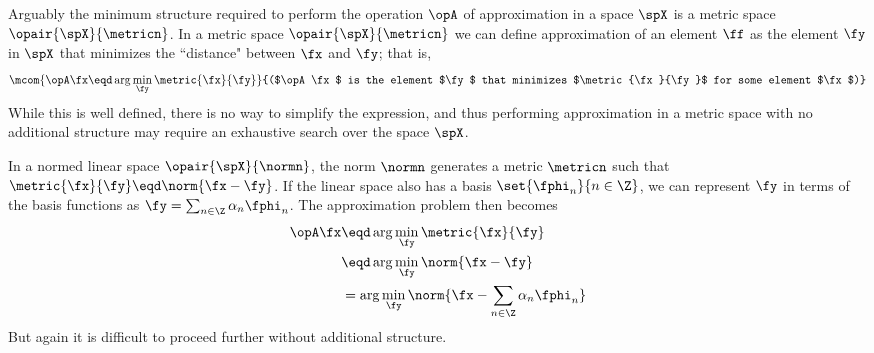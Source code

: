 Arguably the minimum structure required to perform the operation $\opA$ of approximation
in a space $\spX$
is a metric space $\opair{\spX}{\metricn}$.
In a metric space $\opair{\spX}{\metricn}$ we can define approximation of an element $\ff$ as
the element $\fy$ in $\spX$ that minimizes the ``distance" between $\fx$ and $\fy$; that is,
  \[ \mcom{\opA\fx \eqd \arg\min_{\fy} \metric{\fx}{\fy}}
          {($\opA\fx$ is the element $\fy$ that minimizes $\metric{\fx}{\fy}$ for some element $\fx$)} \]
While this is well defined, there is no way to simplify the expression, and thus
performing approximation in a metric space with no additional structure
may require an exhaustive search over the space $\spX$.

In a normed linear space $\opair{\spX}{\normn}$, the norm $\normn$ generates a metric
$\metricn$ such that $\metric{\fx}{\fy}\eqd\norm{\fx-\fy}$.
If the linear space also has a basis $\set{\fphi_n}{n\in\Z}$,
we can represent $\fy$ in terms of the basis functions as
$\fy=\sum_{n\in\Z}\alpha_n\fphi_n$.
The approximation problem then becomes
  \begin{align*}
    \opA\fx
        &\eqd \arg\min_{\fy} \metric{\fx}{\fy}
      \\&\eqd \arg\min_{\fy} \norm{\fx-\fy}
      \\&=    \arg\min_{\fy} \norm{\fx-\sum_{n\in\Z}\alpha_n\fphi_n}
  \end{align*}
But again it is difficult to proceed further without additional structure.

